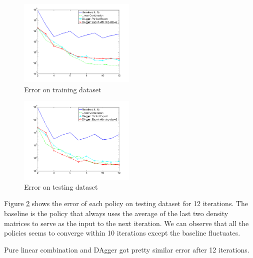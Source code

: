 \documentclass[twoside]{article}
\begin{document}
\begin{figure}[h!]
  \caption{Error on training dataset}
	\label{fig:training}
    \includegraphics[width=210px]{Dagger_beta05_training.png}
\end{figure}

\begin{figure}[h!]

  \caption{Error on testing dataset}
  \label{fig:testing}
    \includegraphics[width=210px]{Dagger_beta05_testing.png}
\end{figure}


Figure \ref{fig:testing} shows the error of each policy on testing dataset for 12 iterations. The baseline is the policy that always uses the average of the last two density matrices to serve as the input to the next iteration.  We can observe that all the policies seems to converge within 10 iterations except the baseline fluctuates.

Pure linear combination and DAgger got pretty similar error after 12 iterations.
\end{document}
